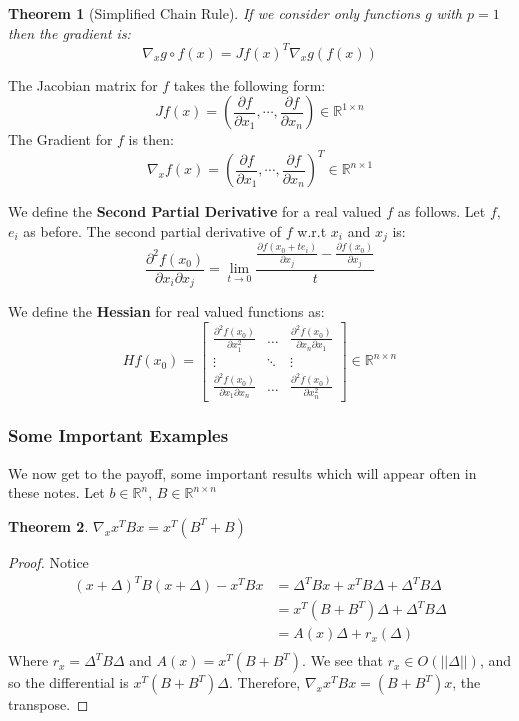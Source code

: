 \documentclass[]{article}
\theoremstyle{mattstyle}
\newtheorem{theorem}{Theorem}[section]
\theoremstyle{definition}
\begin{document}
\begin{theorem}[Simplified Chain Rule]
If we consider only functions $g$ with $p=1$ then the gradient is: $$\nabla_x g \circ f(x) = Jf(x)^T\nabla_{x}g(f(x))$$
\end{theorem} 

The Jacobian matrix for $f$ takes the following form: 
$$J f(x) = \left(\frac{\partial f}{\partial x_1}, \cdots, \frac{\partial f}{\partial x_n}\right) \in \mathbb{R}^{1 \times n}$$
The Gradient for $f$ is then: 
$$\nabla_{x} f(x) = \left(\frac{\partial f}{\partial x_1}, \cdots, \frac{\partial f}{\partial x_n}\right)^T \in \mathbb{R}^{n \times 1}$$

We define the \textbf{Second Partial Derivative} for a real valued $f$ as follows. Let $f$, $e_i$ as before. The second partial derivative of $f$ w.r.t $x_i$ and $x_j$ is:
$$
\frac{\partial^2 f(x_0)}{\partial x_i \partial x_j} = 
\lim\limits_{t \rightarrow 0} \frac{ \frac{\partial f(x_0+te_i)}{\partial x_j} - \frac{\partial f(x_0)}{\partial x_j} }{t}
$$

We define the \textbf{Hessian} for real valued functions as: 
$$H f(x_0) = \begin{bmatrix}
\frac{\partial^2 f(x_0)}{\partial x_1^2} & \dots  & \frac{\partial^2 f(x_0)}{\partial x_n \partial x_1} \\
\vdots & \ddots & \vdots \\
\frac{\partial^2 f(x_0)}{\partial x_1 \partial x_n} & \dots  & \frac{\partial^2 f(x_0)}{\partial x_n^2}
\end{bmatrix}\in \mathbb{R}^{n \times n}$$

\newpage

\subsubsection{Some Important Examples}

We now get to the payoff, some important results which will appear often in these notes. Let $b \in \mathbb{R}^n$, $B \in \mathbb{R}^{n \times n}$

\begin{theorem}
	$\nabla_{x} x^TBx = x^T(B^T+B)$
\end{theorem}
\begin{proof}
	Notice 
	\begin{align*}
	(x+\Delta)^TB(x+\Delta) - x^TBx &= \Delta^TBx + x^TB\Delta + \Delta^TB\Delta\\
	&= x^T(B + B^T)\Delta + \Delta^TB\Delta\\
	&= A(x)\Delta + r_{x}(\Delta)\\
	\end{align*}
	Where $r_{x}=\Delta^TB\Delta$ and $A(x)=x^T(B + B^T)$. We see that $r_{x}\in O(||\Delta||)$, and so the differential is $x^T(B + B^T)\Delta$. Therefore, $\nabla_x x^TBx = (B + B^T)x$, the transpose.
\end{proof}
\end{document}
